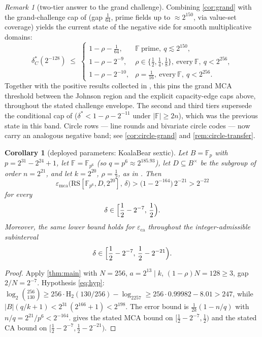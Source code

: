 \documentclass[11pt]{article}
\newtheorem{corollary}[theorem]{Corollary}
\theoremstyle{definition}
\theoremstyle{remark}
\newtheorem{remark}[theorem]{Remark}
\newcommand{\F}{\mathbb{F}}
\newcommand{\B}{B}
\newcommand{\RS}{\mathrm{RS}}
\newcommand{\eca}{\varepsilon_{\mathrm{ca}}}
\newcommand{\emca}{\varepsilon_{\mathrm{mca}}}
\newcommand{\Hb}{\mathrm{H}_2}
\begin{document}
\begin{remark}[two-tier answer to the grand challenge]\label{rem:twotier}
Combining \cref{cor:grand} with the grand-challenge cap of \cite[Prop.\ ``Grand-challenge cap'']{Cho26b} (gap $\frac1{64}$, prime fields up to $\approx2^{150}$, via value-set coverage) yields the current state of the negative side for smooth multiplicative domains:
\[
\delta^*_C(2^{-128})\;\le\;
\begin{cases}
1-\rho-\frac1{64}, & \F\ \text{prime},\ q\lesssim2^{150},\\[2pt]
1-\rho-2^{-9}, & \rho\in\{\frac12,\frac14,\frac18\},\ \text{every}\ \F,\ q<2^{256},\\[2pt]
1-\rho-2^{-10}, & \rho=\frac1{16},\ \text{every}\ \F,\ q<2^{256}.
\end{cases}
\]
Together with the positive results collected in \cite[Table~1]{ABF26}, this pins the grand MCA threshold between the Johnson region and the explicit capacity-edge caps above, throughout the stated challenge envelope. The second and third tiers supersede the conditional cap of \cite[Thm.\ ``Universal cap'']{Cho26b} ($\delta^*<1-\rho-2^{-11}$ under $|\F|\ge2n$), which was the previous state in this band. Circle rows --- line rounds and bivariate circle codes --- now carry an analogous negative band; see \cref{cor:circle-grand} and \cref{rem:circle-transfer}.
\end{remark}

\begin{corollary}[deployed parameters: KoalaBear sextic]\label{cor:deployed}
Let $\B=\F_p$ with $p=2^{31}-2^{24}+1$, let $\F=\F_{p^6}$ (so $q=p^6\approx2^{185.93}$), let $D\subseteq\B^\times$ be the subgroup of order $n=2^{21}$, and let $k=2^{20}$, $\rho=\frac12$, as in \cite[\S6.3]{ABF26}. Then
\[
\emca\bigl(\RS[\F_{p^6},D,2^{20}],\,\delta\bigr)
>
\bigl(1-2^{-164}\bigr)\,2^{-21}
>
2^{-22}
\]
for every
\[
        \delta\in\Bigl[\frac12-2^{-7},\,\frac12\Bigr).
\]
Moreover, the same lower bound holds for $\eca$ throughout the integer-admissible subinterval
\[
        \delta\in
        \Bigl[\frac12-2^{-7},\,\frac12-2^{-21}\Bigr).
\]
\end{corollary}

\begin{proof}
Apply \cref{thm:main} with $N=256$, $a=2^{13}\mid k$, $(1-\rho)N=128\ge3$, gap $2/N=2^{-7}$. Hypothesis \eqref{eq:hyp}: $\log_2\binom{256}{130}\ge256\cdot\Hb(130/256)-\log_2257\ge256\cdot0.99982-8.01>247$, while $|\B|(q/k+1)<2^{31}\,(2^{166}+1)<2^{198}$. The error bound is $\frac1{2k}(1-n/q)$ with $n/q=2^{21}/p^6<2^{-164}$.  gives the stated MCA bound on $[\frac12-2^{-7},\frac12)$ and the stated CA bound on $[\frac12-2^{-7},\frac12-2^{-21})$.
\end{proof}
\end{document}
